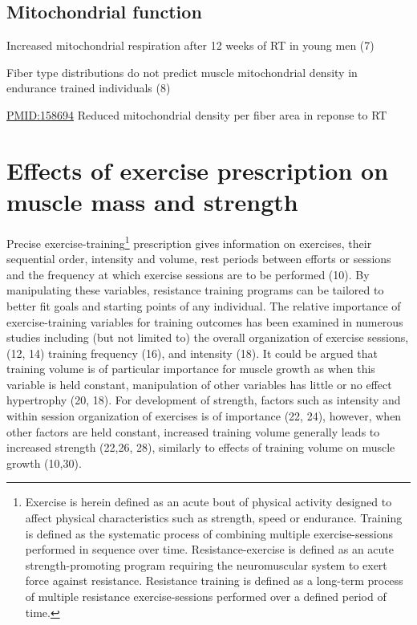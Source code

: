 \documentclass[twoside,10pt]{gihclass} %
\begin{document}
\hypertarget{mitochondrial-function}{%
\subsection{Mitochondrial function}\label{mitochondrial-function}}

Increased mitochondrial respiration after 12 weeks of RT in young men (7)

Fiber type distributions do not predict muscle mitochondrial density in endurance trained individuals (8)

\url{PMID:158694} Reduced mitochondrial density per fiber area in reponse to RT

\hypertarget{effects-of-exercise-prescription-on-muscle-mass-and-strength}{%
\section{Effects of exercise prescription on muscle mass and strength}\label{effects-of-exercise-prescription-on-muscle-mass-and-strength}}

Precise exercise-training\footnote{Exercise is herein defined as an acute bout of physical activity designed to affect physical characteristics such as strength, speed or endurance. Training is defined as the systematic process of combining multiple exercise-sessions performed in sequence over time. Resistance-exercise is defined as an acute strength-promoting program requiring the neuromuscular system to exert force against resistance. Resistance training is defined as a long-term process of multiple resistance exercise-sessions performed over a defined period of time.}
prescription gives information on exercises, their sequential order, intensity and volume, rest periods between efforts or sessions and the frequency at which exercise sessions are to be performed
(10).
By manipulating these variables, resistance training programs can be tailored to better fit goals and starting points of any individual.
The relative importance of exercise-training variables for training outcomes has been examined in numerous studies including (but not limited to) the overall organization of exercise sessions,
(12, 14)
training frequency
(16),
and intensity
(18).
It could be argued that training volume is of particular importance for muscle growth as when this variable is held constant, manipulation of other variables has little or no effect hypertrophy
(20, 18).
For development of strength, factors such as intensity and within session organization of exercises is of importance
(22, 24),
however, when other factors are held constant, increased training volume generally leads to increased strength
(22,26, 28),
similarly to effects of training volume on muscle growth
(10,30).
\end{document}
